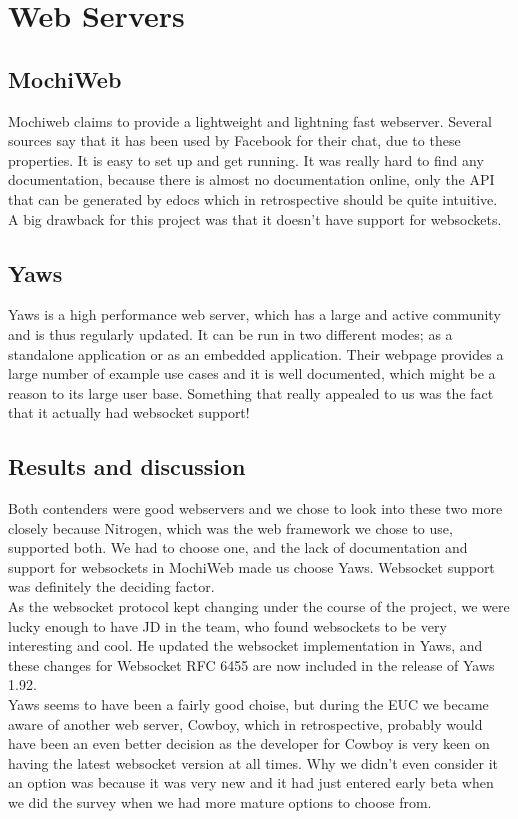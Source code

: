 \documentclass[11pt,a4paper]{report}
\begin{document}
\section{Web Servers}
\subsection{MochiWeb}
Mochiweb\cite{mochiweb} claims to provide a lightweight and lightning fast webserver.
Several sources say that it has been used by Facebook for their chat\cite{fb_chat}\cite{fb_pres},
due to these properties. It is easy to set up and get running. It was really
hard to find any documentation, because there is almost no documentation online,
only the API that can be generated by edocs which in retrospective should be
quite intuitive. A big drawback for this project was that it doesn't have
support for websockets.

\subsection{Yaws}
Yaws\cite{yaws} is a high performance web server, which has a large and active
community and is thus regularly updated. It can be run in two different modes;
as a standalone application or as an embedded application. Their webpage
provides a large number of example use cases and it is well documented, which
might be a reason to its large user base. Something that really appealed to us
was the fact that it actually had websocket support!

\subsection{Results and discussion}
Both contenders were good webservers and we chose to look into these two more
closely because Nitrogen, which was the web framework we chose to use,
supported both. We had to choose one, and the lack of documentation and support
for websockets in MochiWeb made us choose Yaws. Websocket support was definitely
the deciding factor.\\

As the websocket protocol kept changing under the course of the project, we were
lucky enough to have JD in the team, who found websockets to be very interesting
and cool. He updated the websocket implementation in Yaws, and these changes for
Websocket RFC 6455 are now included in the release of Yaws 1.92.\\


Yaws seems to have been a fairly good choise, but during the EUC we became
aware of another web server, Cowboy\cite{cowboy_pres}, which in retrospective,
probably would have been an even better decision as the developer for Cowboy is
very keen on having the latest websocket version at all times. Why we didn't
even consider it an option was because it was very new and it had just entered
early beta when we did the survey when we had more mature options to choose from.
\end{document}
